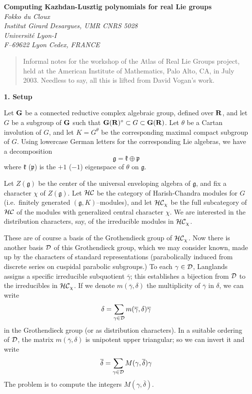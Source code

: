 \documentclass[11 pt]{article}
\def\ov{\overline}
\def\D{{\cal D}}
\def\d{\delta}
\def\G{{\bf G}}
\def\g{\gamma}
\def\gf{{\mathfrak g}}
\def\HC{{\cal HC}}
\def\kf{{\mathfrak k}}
\def\pf{{\mathfrak p}}
\def\R{{\bf R}}
\def\t{\theta}
\begin{document}
\begin{center}
\textbf{Computing Kazhdan-Lusztig polynomials for real Lie groups}\\
\bigskip
\textit{Fokko du Cloux}\\
\textit{Institut Girard Desargues, UMR CNRS 5028}\\
\textit{Universit\'e Lyon-I}\\
\textit{F--69622 Lyon Cedex, FRANCE}
\end{center}

\bigskip

\begin{quote}
\noindent Informal notes for the workshop of the
Atlas of Real Lie Groups project, held at the American Institute of
Mathematics, Palo Alto, CA, in July 2003. Needless to say, all this
is lifted from David Vogan's work.
\end{quote}

\bigskip

\noindent\textbf{1. Setup}

\medskip

\noindent Let $\G$ be a connected reductive complex algebraic group, defined
over $\R$, and let $G$ be a subgroup of $\G$ such that $\G(\R)^\circ\subset G
\subset\G(\R)$. Let $\t$ be a Cartan involution of $G$, and let $K=G^\t$ be
the corresponding maximal compact subgroup of $G$. Using lowercase German
letters for the corresponding Lie algebras, we have a decomposition
$$
\gf=\kf\oplus\pf
$$
where $\kf$ ($\pf$) is the $+1$ ($-1$) eigenspace of $\t$ on $\gf$.

Let $Z(\gf)$ be the center of the universal enveloping algebra of $\gf$, and
fix a character $\chi$ of $Z(\gf)$. Let $\HC$ be the category of Harish-Chandra
modules for $G$ (i.e.\ finitely generated $(\gf,K)$--modules), and let
$\HC_\chi$ be the full subcategory of $\HC$ of the
modules with generalized central character $\chi$. We are interested in the
distribution characters, say, of the irreducible modules in $\HC_\chi$.

These are of course a basis of the Grothendieck group of $\HC_\chi$. Now there
is another basis $\D$ of this Grothendieck group, which we may consider known,
made up by the characters of standard representations (parabolically induced
from discrete series on cuspidal parabolic subgroups.) To each $\g\in\D$,
Langlands assigns a specific irreducible subquotient $\ov\g$; this establishes
a bijection from $\D$ to the irreducibles in $\HC_\chi$. If we denote
$m(\ov\g,\d)$ the multiplicity of $\ov\g$ in $\d$, we can write
$$
\d=\sum_{\g\in\D}m(\ov\g,\d)\ov\g
$$
in the Grothendieck group (or as distribution characters). In a suitable
ordering of $\D$, the matrix $m(\ov\g,\d)$ is unipotent upper triangular; so
we can invert it and write
$$
\ov\d=\sum_{\g\in\D}M(\g,\ov\d)\g
$$
The problem is to compute the integers $M(\g,\ov\d)$.
\end{document}
